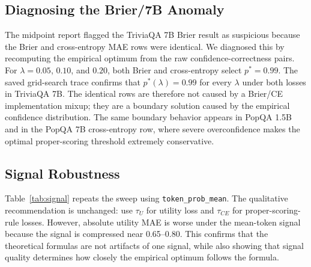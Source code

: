 \documentclass[letterpaper,10pt,twocolumn]{article}
\begin{document}
\subsection{Diagnosing the Brier/7B Anomaly}

The midpoint report flagged the TriviaQA 7B Brier result as suspicious because
the Brier and cross-entropy MAE rows were identical. We diagnosed this by
recomputing the empirical optimum from the raw confidence-correctness pairs.
For $\lambda=0.05$, $0.10$, and $0.20$, both Brier and cross-entropy select
$p^\ast=0.99$. The saved grid-search trace confirms that
$p^\ast(\lambda)=0.99$ for every $\lambda$ under both losses in TriviaQA 7B.
The identical rows are therefore not caused by a Brier/CE implementation mixup;
they are a boundary solution caused by the empirical confidence distribution.
The same boundary behavior appears in PopQA 1.5B and in the PopQA 7B
cross-entropy row, where severe overconfidence makes the optimal
proper-scoring threshold extremely conservative.

\subsection{Signal Robustness}

Table~\ref{tab:signal} repeats the sweep using \texttt{token\_prob\_mean}.
The qualitative recommendation is unchanged: use $\tau_U$ for utility loss
and $\tau_{CE}$ for proper-scoring-rule losses. However, absolute utility MAE
is worse under the mean-token signal because the signal is compressed near
0.65--0.80. This confirms that the theoretical formulas are not artifacts of
one signal, while also showing that signal quality determines how closely the
empirical optimum follows the formula.

\begin{table}[t]
\centering
\caption{Best formula under \texttt{token\_prob\_mean}; entries show point
estimate MAE for the winning formula.}
\label{tab:signal}
\renewcommand{\arraystretch}{1.12}
\end{table}
\end{document}
